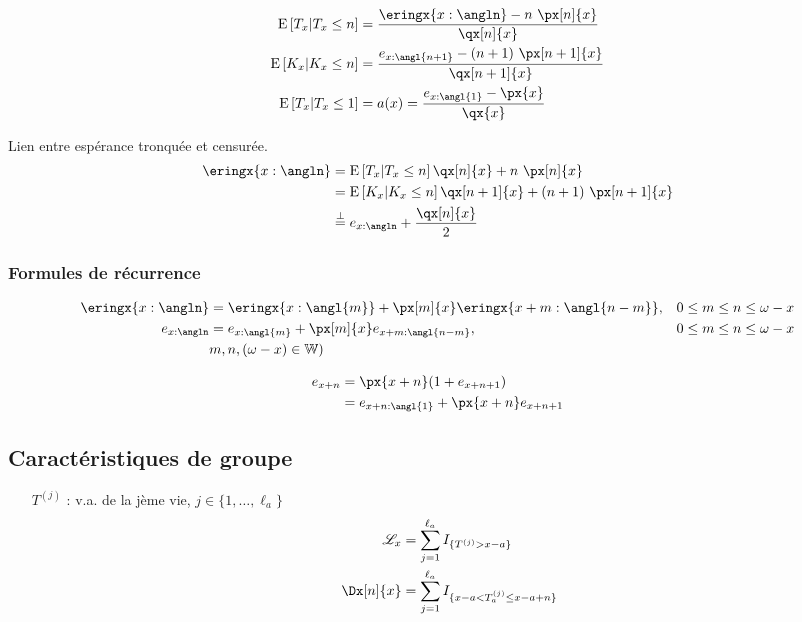 \documentclass[10pt, french]{article}
\begin{document}
\begin{multicols*}{3}
\begin{align*}
	\esp{T_x | T_x \leq n} &= \frac{\eringx{x:\angln} - n \ \px[n]{x}}{\qx[n]{x}} \\
	\esp{K_x | K_x \leq n} &= \frac{e_{x:\angl{n + 1}} - (n + 1) \ \px[n + 1]{x}}{\qx[n + 1]{x}} \\	
	\esp{T_x | T_x \leq 1} &= a(x) = \frac{e_{x:\angl{1}} - \px{x}}{\qx{x}} \\	
\end{align*}

Lien entre espérance tronquée et censurée.
\begin{align*}
	\eringx{x:\angln} &= \esp{T_x | T_x \leq n} \qx[n]{x} + n \ \px[n]{x} \\	
		&= \esp{K_x | K_x \leq n} \qx[n + 1]{x} + (n + 1) \ \px[n + 1]{x} \\	
		&\stackrel{\bot}= e_{x:\angln} + \frac{\qx[n]{x}}{2} 
\end{align*}

\subsubsection*{Formules de récurrence}

\begin{align*}
	\eringx{x:\angln} &= \eringx{x:\angl{m}} + \px[m]{x} \eringx{x + m:\angl{n - m}}, & 0 \leq m \leq n \leq \omega - x  \\
	e_{x:\angln} &= e_{x:\angl{m}} + \px[m]{x} e_{x + m:\angl{n - m}}, & 0 \leq m \leq n \leq \omega - x  \\
	&m, n, (\omega - x) \in \mathbb{W})
\end{align*}

\begin{align*}
	e_{x + n} &= \px{x + n} (1 + e_{x + n + 1}) \\
			  &= e_{x + n:\angl{1}} + \px{x + n} e_{x + n + 1} 
\end{align*}

\subsection{Caractéristiques de groupe}
\begin{itemize}
\item[$T^{(j)}$ : ] v.a. de la jème vie, $j \in \{1, \dots, \ell_a\}$
\begin{align*}
	\mathscr{L}_x &= \sum_{j = 1}^{\ell_a} I_{\{T^{(j)} > x - a\}} \\
	\Dx[n]{x} &= \sum_{j = 1}^{\ell_a} I_{\{x - a < T^{(j)}_a \le x - a + n\}} \\
\end{align*}


\end{itemize}
\end{multicols*}
\end{document}

